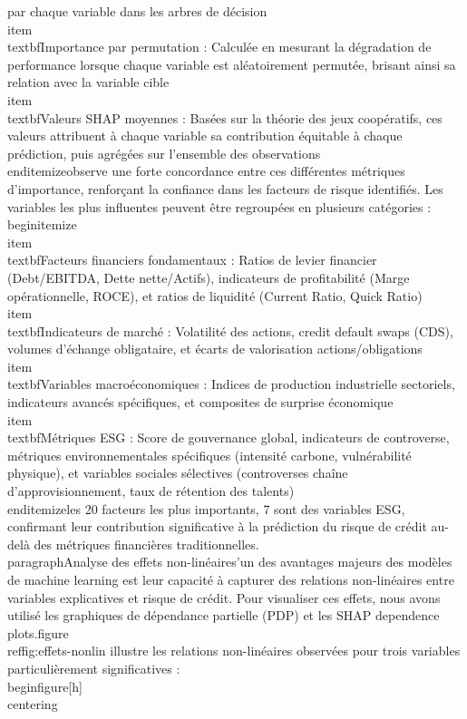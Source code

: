 par chaque variable dans les arbres de décision\n    \n    \\item \\textbf{Importance par permutation} : Calculée en mesurant la dégradation de performance lorsque chaque variable est aléatoirement permutée, brisant ainsi sa relation avec la variable cible\n    \n    \\item \\textbf{Valeurs SHAP moyennes} : Basées sur la théorie des jeux coopératifs, ces valeurs attribuent à chaque variable sa contribution équitable à chaque prédiction, puis agrégées sur l'ensemble des observations\n\\end{itemize}\n\nOn observe une forte concordance entre ces différentes métriques d'importance, renforçant la confiance dans les facteurs de risque identifiés. Les variables les plus influentes peuvent être regroupées en plusieurs catégories :\n\n\\begin{itemize}\n    \\item \\textbf{Facteurs financiers fondamentaux} : Ratios de levier financier (Debt/EBITDA, Dette nette/Actifs), indicateurs de profitabilité (Marge opérationnelle, ROCE), et ratios de liquidité (Current Ratio, Quick Ratio)\n    \n    \\item \\textbf{Indicateurs de marché} : Volatilité des actions, credit default swaps (CDS), volumes d'échange obligataire, et écarts de valorisation actions/obligations\n    \n    \\item \\textbf{Variables macroéconomiques} : Indices de production industrielle sectoriels, indicateurs avancés spécifiques, et composites de surprise économique\n    \n    \\item \\textbf{Métriques ESG} : Score de gouvernance global, indicateurs de controverse, métriques environnementales spécifiques (intensité carbone, vulnérabilité physique), et variables sociales sélectives (controverses chaîne d'approvisionnement, taux de rétention des talents)\n\\end{itemize}\n\nParmi les 20 facteurs les plus importants, 7 sont des variables ESG, confirmant leur contribution significative à la prédiction du risque de crédit au-delà des métriques financières traditionnelles.\n\n\\paragraph{Analyse des effets non-linéaires}\n\nL'un des avantages majeurs des modèles de machine learning est leur capacité à capturer des relations non-linéaires entre variables explicatives et risque de crédit. Pour visualiser ces effets, nous avons utilisé les graphiques de dépendance partielle (PDP) et les SHAP dependence plots.\n\nLa figure \\ref{fig:effets-nonlin} illustre les relations non-linéaires observées pour trois variables particulièrement significatives :\n\n\\begin{figure}[h]\n\\centering\n%